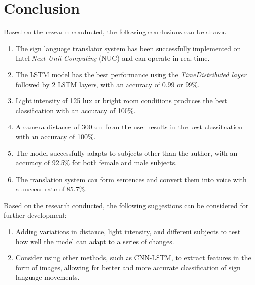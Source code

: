 \section{Conclusion}
\label{sec:conclusion}


Based on the research conducted, the following conclusions can be drawn:

\begin{enumerate}[nolistsep]
    \item The sign language translator system has been successfully implemented on Intel \emph{Next Unit Computing} (NUC) and can operate in real-time.
    \item The LSTM model has the best performance using the \emph{TimeDistributed layer} followed by 2 LSTM layers, with an accuracy of 0.99 or 99\%.
    \item Light intensity of 125 lux or bright room conditions produces the best classification with an accuracy of 100\%.
    \item A camera distance of 300 cm from the user results in the best classification with an accuracy of 100\%.
    \item The model successfully adapts to subjects other than the author, with an accuracy of 92.5\% for both female and male subjects.
    \item The translation system can form sentences and convert them into voice with a success rate of 85.7\%.
\end{enumerate}

Based on the research conducted, the following suggestions can be considered for further development:

\begin{enumerate}[nolistsep]
  \item Adding variations in distance, light intensity, and different subjects to test how well the model can adapt to a series of changes.
  \item Consider using other methods, such as CNN-LSTM, to extract features in the form of images, allowing for better and more accurate classification of sign language movements.
\end{enumerate}

